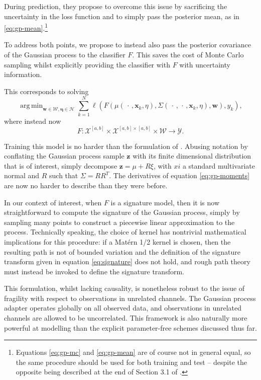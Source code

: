 \documentclass{article}
\DeclareMathOperator*{\argmin}{arg\,min}
\newcommand{\dataspace}{\mathcal{X}}
\newcommand{\lspace}{\mathcal{Y}}
\begin{document}
During prediction, they propose to overcome this issue by sacrificing the uncertainty in the loss function and to simply pass the posterior mean, as in \eqref{eq:gp-mean}.\footnote{Equations \eqref{eq:gp-mc} and \eqref{eq:gp-mean} are of course not in general equal, so the same procedure should be used for both training and test -- despite the opposite being described at the end of Section 3.1 of \citep{li2016scalable}.}

To address both points, we propose to instead also pass the posterior covariance of the Gaussian process to the classifier $F$. This saves the cost of Monte Carlo sampling whilst explicitly providing the classifier with $F$ with uncertainty information.

This corresponds to solving
\begin{equation}\label{eq:gp-moments}
\argmin_{\mathbf{w} \in \mathcal{W},\bm{\eta} \in \mathcal{H}} \sum_{k=1}^N \ell(F(\mu(\,\cdot\,,\mathbf{x}_k, \eta), \Sigma(\,\cdot\,,\,\cdot\,,\mathbf{x}_k, \eta), \mathbf{w}), y_k),
\end{equation}
where instead now
\begin{equation*}
    F \colon \dataspace^{[a, b]} \times \dataspace^{[a, b] \times [a, b]} \times \mathcal{W} \to \lspace.
\end{equation*}

Training this model is no harder than the formulation of \citet{li2016scalable}. Abusing notation by conflating the Gaussian process sample $\mathbf{z}$ with its finite dimensional distribution that is of interest, simply decompose $\mathbf{z} = \mu + R \xi$, with $xi$ a standard multivariate normal and $R$ such that $\Sigma = RR^T$. The derivatives of equation \eqref{eq:gp-moments} are now no harder to describe than they were before.

In our context of interest, when $F$ is a signature model, then it is now straightforward to compute the signature of the Gaussian process, simply by sampling many points to construct a piecewise linear approximation to the process. Technically speaking, the choice of kernel has nontrivial mathematical implications for this procedure: if a Mat{\'e}rn 1/2 kernel is chosen, then the resulting path is not of bounded variation and the definition of the signature transform given in equation \eqref{eq:signature} does not hold, and rough path theory \citep{lyons1998differential} must instead be invoked to define the signature transform.

This formulation, whilst lacking causality, is nonetheless robust to the issue of fragility with respect to observations in unrelated channels. The Gaussian process adapter operates globally on all observed data, and observations in unrelated channels are allowed to be uncorrelated. This framework is also naturally more powerful at modelling than the explicit parameter-free schemes discussed thus far.
\end{document}
